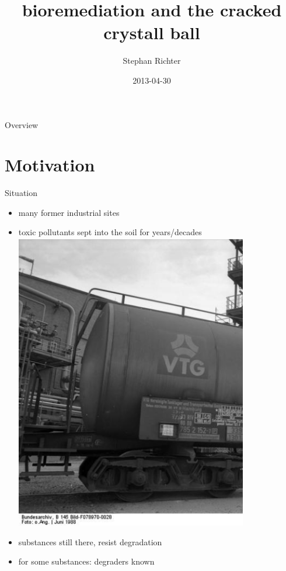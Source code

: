 \documentclass[style=aggie]{powerdot}
\title{bioremediation and the cracked crystall ball}
\author{Stephan Richter}
\date{2013-04-30}
\begin{document}
\maketitle

\begin{slide}{Overview}
\tableofcontents[content=sections]
\end{slide}

\section{Motivation}
\begin{slide}{Situation}
\begin{itemize}
 \item many former industrial sites
 \item toxic pollutants sept into the soil for years/decades
 \includegraphics[width=0.8\textwidth]{waggon.ps}
 \item substances still there, resist degradation
 \item for some substances: degraders known
\end{itemize}
\end{slide}
\end{document}

